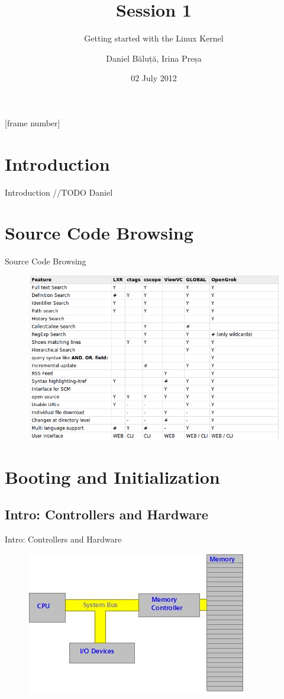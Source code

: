 \documentclass{workshop}
\title[Sesssion 1]{Session 1}
\subtitle{Getting started with the Linux Kernel}
\author{Daniel Băluță, Irina Preșa}
\date{02 July 2012}
\begin{document}
[frame number]

\frame{\titlepage}

\section{Introduction}

\begin{frame}{Introduction}
//TODO Daniel
\end{frame}

\section{Source Code Browsing}

\begin{frame}{Source Code Browsing}
\begin{figure}
  \includegraphics[scale=0.35]{img/source.png}
\end{figure}
\end{frame}

\section{Booting and Initialization}
\subsection{Intro: Controllers and Hardware}
\begin{frame}{Intro: Controllers and Hardware}
     \begin{figure}
         \includegraphics[scale=0.9]{img/bus.jpg}
      \end{figure}
\end{frame}
\end{document}

